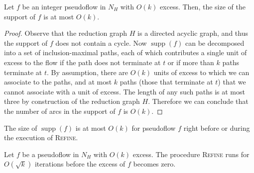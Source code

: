 \documentclass[a4paper,UKenglish]{socg-lipics-v2018}
\def\supp{\operatorname{supp}}
\theoremstyle{plain}
\numberwithin{figure}{section}
\begin{document}
\begin{lemmarep}
\label{lemma:reduction_count}
Let $f$ be an integer pseudoflow in $N_H$ with $O(k)$ excess.
Then, the size of the support of $f$ is at most $O(k)$.
\end{lemmarep}

\begin{proof}
Observe that the reduction graph $H$ is a directed acyclic graph, and thus the support of $f$ does not contain a cycle.
Now $\supp(f)$ can be decomposed into a set of inclusion-maximal paths,
each of which contributes a single unit of excess to the flow if the path does not terminate at $t$ or if more than $k$ paths terminate at $t$.
By assumption, there are $O(k)$ units of excess to which we can associate to the paths, and at most $k$ paths (those that terminate at $t$) that we cannot associate with a unit of excess.
The length of any such paths is at most  three by construction of the reduction graph $H$.
Therefore we can conclude that the number of arcs in the support of $f$ is $O(k)$.
\end{proof}

\begin{corollary}
\label{corollary:support_size_during}
The size of $\supp(f)$ is at most $O(k)$ for pseudoflow $f$ right before or during the execution of \textsc{Refine}.
\end{corollary}


\begin{lemmarep}
\label{lemma:goldberg_refine_iterations}
Let $f$ be a pseudoflow in $N_H$ with $O(k)$ excess.
The procedure \textsc{Refine} runs for $O(\sqrt{k})$ iterations
before the excess of $f$ becomes zero.
\end{lemmarep}
\end{document}
